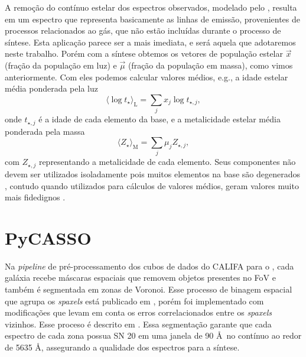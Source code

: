 A remoção do contínuo estelar dos espectros observados, modelado pelo \starlight, resulta em um espectro que representa basicamente as linhas de emissão, provenientes de processos relacionados ao gás, que não estão incluídas durante o processo de síntese. Esta aplicação parece ser a mais imediata, e será aquela que adotaremos neste trabalho. Porém com a síntese obtemos os vetores de população estelar $\vec{x}$ (fração da população em luz) e $\vec{\mu}$ (fração da população em massa), como vimos anteriormente. Com eles podemos calcular valores médios, e.g., a idade estelar média ponderada pela luz
\begin{equation}
	\langle \log t_\star \rangle_{\mathrm{L}} = \sum_j x_j \log t_{\star,j},
\end{equation}
\noindent onde $t_{\star,j}$ é a idade de cada elemento da base, e a metalicidade estelar média ponderada pela massa
\begin{equation}
	\langle Z_\star \rangle_{\mathrm{M}} = \sum_j \mu_j Z_{\star, j},
\end{equation}
\noindent com $Z_{\star, j}$ representando a metalicidade de cada elemento. Seus componentes não devem ser utilizados isoladamente pois muitos elementos na base são degenerados \citep{CidFernandes.etal.2005a}, contudo quando utilizados para cálculos de valores médios, geram valores muito mais fidedignos \citep{CidFernandes.etal.2014a}.


\section{PyCASSO}
\label{sec:sample:pycasso}

Na {\em pipeline} de pré-processamento dos cubos de dados do CALIFA para o \starlight, cada galáxia recebe máscaras espaciais que removem objetos presentes no FoV e também é segmentada em zonas de Voronoi. Esse processo de binagem espacial que agrupa os {\em spaxels} está publicado em \citet{Cappellari.and.Copin.2003}, porém foi implementado com modificações que levam em conta os erros correlacionados entre os {\em spaxels} vizinhos. Esse proceso é descrito em \citet{CidFernandes.etal.2013a}. Essa segmentação garante que cada espectro de cada zona possua SN 20 em uma janela de 90 \AA\ no contínuo ao redor de 5635 \AA, assegurando a qualidade dos espectros para a síntese.

